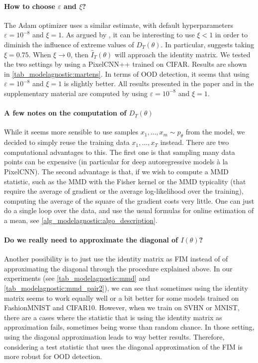 {\paragraph{How to choose $\varepsilon$ and $\xi$?} The Adam optimizer uses a similar estimate, with default hyperparameters $\varepsilon = 10^{-8}$ and $\xi = 1$. As argued by \textcite{martens_new_2020}, it can be interesting to use $\xi <1$  in order to diminish the influence of extreme values of $D_T({\theta})$. In particular, \textcite{martens_new_2020} suggests taking $\xi = 0.75$. When $\xi \longrightarrow 0$, then $\hat{I}_T({\theta})$ will approach the identity matrix. We tested the two settings by using a PixelCNN++ trained on CIFAR. Results are shown in \cref{tab_modelagnostic:martens}. In terms of OOD detection, it seems that using $\varepsilon = 10^{-8}$ and $\xi = 1$ is slightly better. All results presented in the paper and in the supplementary material are computed by using $\varepsilon = 10^{-8}$ and $\xi = 1$.



\paragraph{A few notes on the computation of $D_T({\theta})$} While it seems more sensible to use samples $x_1,...,x_m\sim p_\theta $ from the model, we decided to simply reuse the training data $x_1,...,x_T $ instead. There are two computational advantages to this. The first one is that sampling many data points can be expensive (in particular for deep autoregressive models à la PixelCNN). The second advantage is that, if we wish to compute a MMD statistic, such as the MMD with the Fisher kernel or the MMD typicality (that require the average of gradient or the average log-likelihood over the training), computing the average of the square of the gradient costs very little. One can just do a single loop over the data, and use the usual formulas for online estimation of a mean, see \cref{alg_modelagnostic:algo_description}.


\paragraph{Do we really need to approximate the diagonal of $I({\theta})$?} 
Another possibility is to just use the identity matrix as FIM instead of of approximating the diagonal through the procedure explained above. In our experiments (see \cref{tab_modelagnostic:mmd} and \cref{tab_modelagnostic:mmd_pair2}), we can see that sometimes using the identity matrix seems to work equally well or a bit better for some models trained on FashionMNIST and CIFAR10. However, when we train on SVHN or MNIST, there are a cases where the statistic that is using the identity matrix as approximation fails, sometimes being worse than random chance. In those setting, using the diagonal approximation leads to way better results. Therefore, considering a test statistic that uses the diagonal approximation of the FIM is more robust for OOD detection.


}
